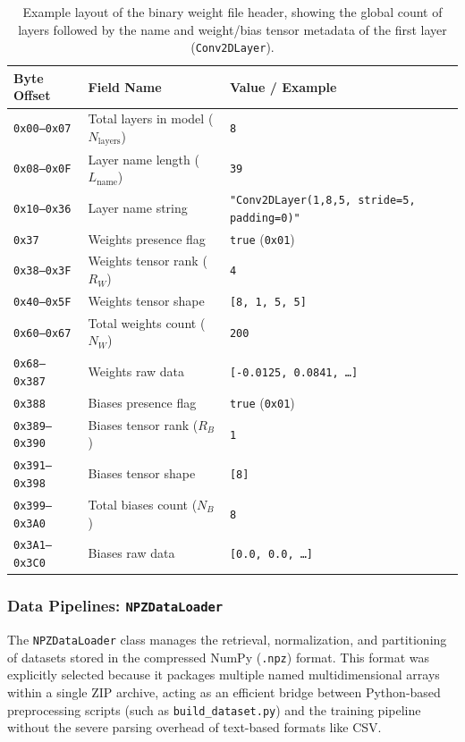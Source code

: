 \begin{table}[h!]
  \centering
  \caption{Example layout of the binary weight file header, showing the global count of layers followed by the name and weight/bias tensor metadata of the first layer (\texttt{Conv2DLayer}).}
  \label{tab:weights_header_example}
  \begin{tabular}{lll}
    \hline
    Byte Offset & Field Name & Value / Example \\
    \hline
    \texttt{0x00--0x07}   & Total layers in model ($N_{\text{layers}}$) & \texttt{8} \\
    \texttt{0x08--0x0F}   & Layer name length ($L_{\text{name}}$) & \texttt{39} \\
    \texttt{0x10--0x36}   & Layer name string & \texttt{"Conv2DLayer(1,8,5, stride=5, padding=0)"} \\
    \texttt{0x37}         & Weights presence flag & \texttt{true} (\texttt{0x01}) \\
    \texttt{0x38--0x3F}   & Weights tensor rank ($R_W$) & \texttt{4} \\
    \texttt{0x40--0x5F}   & Weights tensor shape & \texttt{[8, 1, 5, 5]} \\
    \texttt{0x60--0x67}   & Total weights count ($N_W$) & \texttt{200} \\
    \texttt{0x68--0x387}  & Weights raw data & \texttt{[-0.0125, 0.0841, \dots]} \\
    \texttt{0x388}        & Biases presence flag & \texttt{true} (\texttt{0x01}) \\
    \texttt{0x389--0x390} & Biases tensor rank ($R_B$) & \texttt{1} \\
    \texttt{0x391--0x398} & Biases tensor shape & \texttt{[8]} \\
    \texttt{0x399--0x3A0} & Total biases count ($N_B$) & \texttt{8} \\
    \texttt{0x3A1--0x3C0} & Biases raw data & \texttt{[0.0, 0.0, \dots]} \\
    \hline
  \end{tabular}
\end{table}

\subsubsection{Data Pipelines: \texttt{NPZDataLoader}}

The \texttt{NPZDataLoader} class manages the retrieval, normalization, and partitioning of datasets stored in the compressed NumPy (\texttt{.npz}) format. This format was explicitly selected because it packages multiple named multidimensional arrays within a single ZIP archive, acting as an efficient bridge between Python-based preprocessing scripts (such as \texttt{build\_dataset.py}) and the \cpp training pipeline without the severe parsing overhead of text-based formats like CSV.\\

